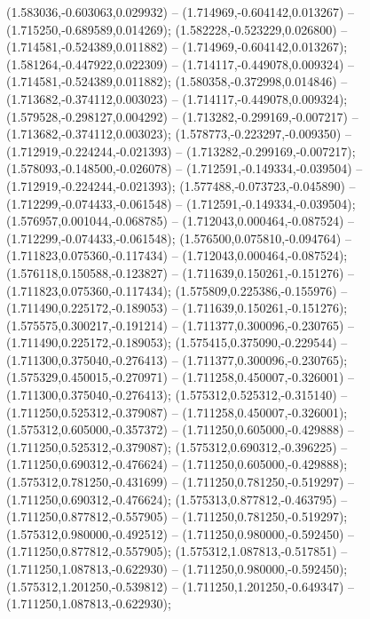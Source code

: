  (1.583036,-0.603063,0.029932) -- (1.714969,-0.604142,0.013267) -- (1.715250,-0.689589,0.014269);
 (1.582228,-0.523229,0.026800) -- (1.714581,-0.524389,0.011882) -- (1.714969,-0.604142,0.013267);
 (1.581264,-0.447922,0.022309) -- (1.714117,-0.449078,0.009324) -- (1.714581,-0.524389,0.011882);
 (1.580358,-0.372998,0.014846) -- (1.713682,-0.374112,0.003023) -- (1.714117,-0.449078,0.009324);
 (1.579528,-0.298127,0.004292) -- (1.713282,-0.299169,-0.007217) -- (1.713682,-0.374112,0.003023);
 (1.578773,-0.223297,-0.009350) -- (1.712919,-0.224244,-0.021393) -- (1.713282,-0.299169,-0.007217);
 (1.578093,-0.148500,-0.026078) -- (1.712591,-0.149334,-0.039504) -- (1.712919,-0.224244,-0.021393);
 (1.577488,-0.073723,-0.045890) -- (1.712299,-0.074433,-0.061548) -- (1.712591,-0.149334,-0.039504);
 (1.576957,0.001044,-0.068785) -- (1.712043,0.000464,-0.087524) -- (1.712299,-0.074433,-0.061548);
 (1.576500,0.075810,-0.094764) -- (1.711823,0.075360,-0.117434) -- (1.712043,0.000464,-0.087524);
 (1.576118,0.150588,-0.123827) -- (1.711639,0.150261,-0.151276) -- (1.711823,0.075360,-0.117434);
 (1.575809,0.225386,-0.155976) -- (1.711490,0.225172,-0.189053) -- (1.711639,0.150261,-0.151276);
 (1.575575,0.300217,-0.191214) -- (1.711377,0.300096,-0.230765) -- (1.711490,0.225172,-0.189053);
 (1.575415,0.375090,-0.229544) -- (1.711300,0.375040,-0.276413) -- (1.711377,0.300096,-0.230765);
 (1.575329,0.450015,-0.270971) -- (1.711258,0.450007,-0.326001) -- (1.711300,0.375040,-0.276413);
 (1.575312,0.525312,-0.315140) -- (1.711250,0.525312,-0.379087) -- (1.711258,0.450007,-0.326001);
 (1.575312,0.605000,-0.357372) -- (1.711250,0.605000,-0.429888) -- (1.711250,0.525312,-0.379087);
 (1.575312,0.690312,-0.396225) -- (1.711250,0.690312,-0.476624) -- (1.711250,0.605000,-0.429888);
 (1.575312,0.781250,-0.431699) -- (1.711250,0.781250,-0.519297) -- (1.711250,0.690312,-0.476624);
 (1.575313,0.877812,-0.463795) -- (1.711250,0.877812,-0.557905) -- (1.711250,0.781250,-0.519297);
 (1.575312,0.980000,-0.492512) -- (1.711250,0.980000,-0.592450) -- (1.711250,0.877812,-0.557905);
 (1.575312,1.087813,-0.517851) -- (1.711250,1.087813,-0.622930) -- (1.711250,0.980000,-0.592450);
 (1.575312,1.201250,-0.539812) -- (1.711250,1.201250,-0.649347) -- (1.711250,1.087813,-0.622930);
